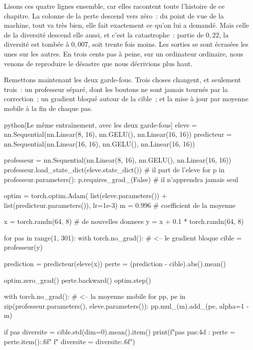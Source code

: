 Lisons ces quatre lignes ensemble, car elles racontent toute l'histoire de
ce chapitre. La colonne de la perte descend vers zéro~: du point de vue de
la machine, tout va très bien, elle fait exactement ce qu'on lui a demandé.
Mais celle de la diversité descend elle aussi, et c'est la catastrophe~:
partie de
$0{,}22$, la diversité est tombée à $0{,}007$, soit trente fois moins. Les
sorties se sont écrasées les unes sur les autres. En trois cents pas à
peine, sur un ordinateur ordinaire, nous venons de reproduire le désastre
que nous décrivions plus haut.

Remettons maintenant les deux garde-fous. Trois choses changent, et
seulement trois~: un professeur séparé, dont les boutons ne sont jamais
tournés par la correction~; un gradient bloqué autour de la cible~; et la mise à
jour par moyenne mobile à la fin de chaque pas.

\begin{code}{python}[Le même entraînement, avec les deux garde-fous]
eleve = nn.Sequential(nn.Linear(8, 16), nn.GELU(), nn.Linear(16, 16))
predicteur = nn.Sequential(nn.Linear(16, 16), nn.GELU(), nn.Linear(16, 16))

professeur = nn.Sequential(nn.Linear(8, 16), nn.GELU(), nn.Linear(16, 16))
professeur.load_state_dict(eleve.state_dict())   # il part de l'eleve
for p in professeur.parameters():
    p.requires_grad_(False)                      # il n'apprendra jamais seul

optim = torch.optim.Adam(
    list(eleve.parameters()) + list(predicteur.parameters()), lr=1e-3)
m = 0.996                                        # coefficient de la moyenne

x = torch.randn(64, 8)                           # de nouvelles donnees
y = x + 0.1 * torch.randn(64, 8)

for pas in range(1, 301):
    with torch.no_grad():                        # <-- le gradient bloque
        cible = professeur(y)

    prediction = predicteur(eleve(x))
    perte = (prediction - cible).abs().mean()

    optim.zero_grad()
    perte.backward()
    optim.step()

    with torch.no_grad():                        # <-- la moyenne mobile
        for pp, pe in zip(professeur.parameters(), eleve.parameters()):
            pp.mul_(m).add_(pe, alpha=1 - m)

    if pas %
        diversite = cible.std(dim=0).mean().item()
        print(f"pas {pas:4d} : perte = {perte.item():.6f}"
              f"   diversite = {diversite:.6f}")
\end{code}

